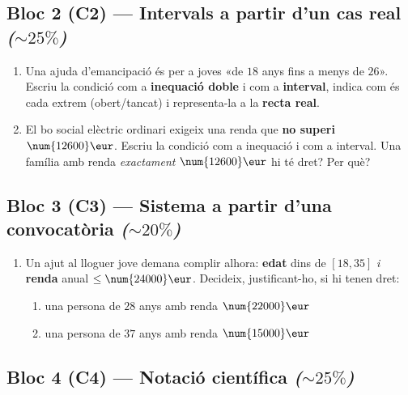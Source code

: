 \subsection*{Bloc 2 (C2) — Intervals a partir d'un cas real \hfill \normalfont\itshape ($\sim 25\%$)}

\begin{enumerate}[label=\textbf{\arabic*.}, leftmargin=2em, itemsep=8pt, start=2]
  \item Una ajuda d'emancipació és per a joves «de $18$ anys fins a menys de $26$».
        Escriu la condició com a \textbf{inequació doble} i com a \textbf{interval},
        indica com és cada extrem (obert/tancat) i representa-la a la \textbf{recta real}.
  \item El bo social elèctric ordinari exigeix una renda que \textbf{no superi}
        $\num{12600}\eur$. Escriu la condició com a inequació i com a interval. Una
        família amb renda \emph{exactament} $\num{12600}\eur$ hi té dret? Per què?
\end{enumerate}

\subsection*{Bloc 3 (C3) — Sistema a partir d'una convocatòria \hfill \normalfont\itshape ($\sim 20\%$)}

\begin{enumerate}[label=\textbf{\arabic*.}, leftmargin=2em, itemsep=8pt, start=4]
  \item Un ajut al lloguer jove demana complir alhora: \textbf{edat} dins de
        $[18,35]$ \emph{i} \textbf{renda} anual $\le\num{24000}\eur$. Decideix,
        justificant-ho, si hi tenen dret:
    \begin{enumerate}[label=\alph*), leftmargin=1.6em, topsep=2pt]
      \item una persona de $28$ anys amb renda $\num{22000}\eur$
      \item una persona de $37$ anys amb renda $\num{15000}\eur$
    \end{enumerate}
\end{enumerate}

\subsection*{Bloc 4 (C4) — Notació científica \hfill \normalfont\itshape ($\sim 25\%$)}

